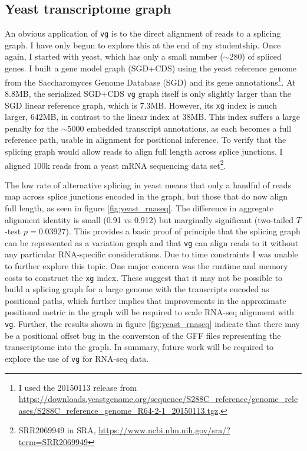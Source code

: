 \documentclass[a4paper,12pt,numbered,oneside]{Classes/PhDThesisPSnPDF}
\begin{document}
\subsection{Yeast transcriptome graph}

An obvious application of {\tt vg} is to the direct alignment of reads to a splicing graph.
I have only begun to explore this at the end of my studentship.
Once again, I started with yeast, which has only a small number ($\sim$280) of spliced genes.
I built a gene model graph (SGD+CDS) using the yeast reference genome from the Saccharomyces Genome Database (SGD) and its gene annotations\footnote{I used the 20150113 release from \url{https://downloads.yeastgenome.org/sequence/S288C_reference/genome_releases/S288C_reference_genome_R64-2-1_20150113.tgz}.}.
At 8.8MB, the serialized SGD+CDS {\tt vg} graph itself is only slightly larger than the SGD linear reference graph, which is 7.3MB.
However, its {\tt xg} index is much larger, 642MB, in contrast to the linear index at 38MB.
This index suffers a large penalty for the $\sim$5000 embedded transcript annotations, as each becomes a full reference path, usable in alignment for positional inference.
To verify that the splicing graph would allow reads to align full length across splice junctions, I aligned 100k reads from a yeast mRNA sequencing data set\footnote{SRR2069949 in SRA, \url{https://www.ncbi.nlm.nih.gov/sra/?term=SRR2069949}}.

The low rate of alternative splicing in yeast means that only a handful of reads map across splice junctions encoded in the graph, but those that do now align full length, as seen in figure \ref{fig:yeast_rnaseq}.
The difference in aggregate alignment identity is small (0.91 vs 0.912) but marginally significant (two-tailed $T$-test $p=0.03927$).
This provides a basic proof of principle that the splicing graph can be represented as a variation graph and that {\tt vg} can align reads to it without any particular RNA-specific considerations.
Due to time constraints I was unable to further explore this topic.
One major concern was the runtime and memory costs to construct the {\tt xg} index.
These suggest that it may not be possible to build a splicing graph for a large genome with the transcripts encoded as positional paths, which further implies that improvements in the approximate positional metric in the graph will be required to scale RNA-seq alignment with {\tt vg}.
Further, the results shown in figure \ref{fig:yeast_rnaseq} indicate that there may be a positional offset bug in the conversion of the GFF files representing the transcriptome into the graph.
In summary, future work will be required to explore the use of {\tt vg} for RNA-seq data.
\end{document}
